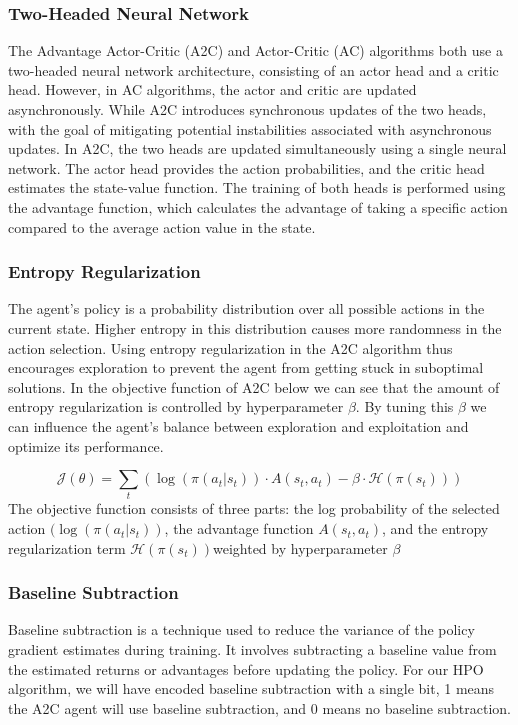 \documentclass{article}
\begin{document}
\subsubsection{Two-Headed Neural Network}
The Advantage Actor-Critic (A2C) and Actor-Critic (AC) algorithms both use a two-headed neural network architecture, consisting of an actor head and a critic head. However, in AC algorithms, the actor and critic are updated asynchronously. While A2C introduces synchronous updates of the two heads, with the goal of mitigating potential instabilities associated with asynchronous updates. In A2C, the two heads are updated simultaneously using a single neural network. The actor head provides the action probabilities, and the critic head estimates the state-value function. The training of both heads is performed using the advantage function, which calculates the advantage of taking a specific action compared to the average action value in the state. 


\subsubsection{Entropy Regularization}

The agent's policy is a probability distribution over all possible actions in the current state. Higher entropy in this distribution causes more randomness in the action selection. Using entropy regularization in the A2C algorithm thus encourages exploration to prevent the agent from getting stuck in suboptimal solutions. In the objective function of A2C below we can see that the amount of entropy regularization is controlled by hyperparameter $\beta.$ By tuning this $\beta$ we can influence the agent's balance between exploration and exploitation and optimize its performance.

\[
\mathcal{J}(\theta) = \sum_{t} \left( \log(\pi(a_t|s_t)) \cdot A(s_t, a_t) - \beta \cdot \mathcal{H}(\pi(s_t)) \right)
\]
The objective function consists of three parts: the log probability of the selected action $( \log(\pi(a_t|s_t))$, the advantage function $A(s_t, a_t)$, and the entropy regularization term $\mathcal{H}(\pi(s_t))$weighted by hyperparameter $\beta$

\subsubsection{Baseline Subtraction}
Baseline subtraction is a technique used to reduce the variance of the policy gradient estimates during training. It involves subtracting a baseline value from the estimated returns or advantages before updating the policy. For our HPO algorithm, we will have encoded baseline subtraction with a single bit, 1 means the A2C agent will use baseline subtraction, and 0 means no baseline subtraction.
\end{document}
